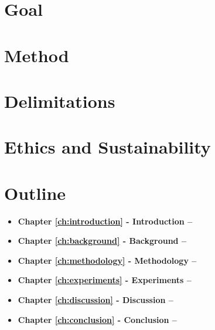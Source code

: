 % 
\section{Goal}


\section{Method}


\section{Delimitations}


\section{Ethics and Sustainability}


\section{Outline}
\begin{itemize}
    \item \textbf{Chapter \ref{ch:introduction} - Introduction --}
    \item \textbf{Chapter \ref{ch:background} - Background --}
    \item \textbf{Chapter \ref{ch:methodology} - Methodology --}
    \item \textbf{Chapter \ref{ch:experiments} - Experiments --}
    \item \textbf{Chapter \ref{ch:discussion} - Discussion --}
    \item \textbf{Chapter \ref{ch:conclusion} - Conclusion --}
\end{itemize}
